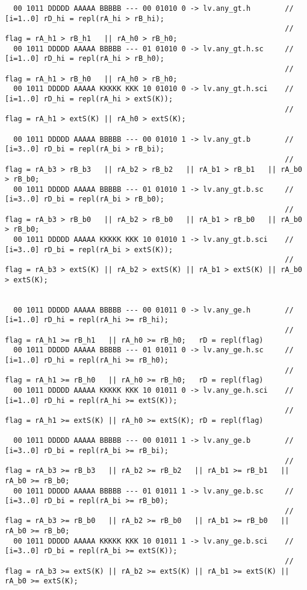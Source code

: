 \begin{landscape}
{\begin{verbatim}
  00 1011 DDDDD AAAAA BBBBB --- 00 01010 0 -> lv.any_gt.h        // [i=1..0] rD_hi = repl(rA_hi > rB_hi);    
                                                                 // flag = rA_h1 > rB_h1   || rA_h0 > rB_h0;
  00 1011 DDDDD AAAAA BBBBB --- 01 01010 0 -> lv.any_gt.h.sc     // [i=1..0] rD_hi = repl(rA_hi > rB_h0);    
                                                                 // flag = rA_h1 > rB_h0   || rA_h0 > rB_h0;
  00 1011 DDDDD AAAAA KKKKK KKK 10 01010 0 -> lv.any_gt.h.sci    // [i=1..0] rD_hi = repl(rA_hi > extS(K));  
                                                                 // flag = rA_h1 > extS(K) || rA_h0 > extS(K);

  00 1011 DDDDD AAAAA BBBBB --- 00 01010 1 -> lv.any_gt.b        // [i=3..0] rD_bi = repl(rA_bi > rB_bi);    
                                                                 // flag = rA_b3 > rB_b3   || rA_b2 > rB_b2   || rA_b1 > rB_b1   || rA_b0 > rB_b0;
  00 1011 DDDDD AAAAA BBBBB --- 01 01010 1 -> lv.any_gt.b.sc     // [i=3..0] rD_bi = repl(rA_bi > rB_b0);    
                                                                 // flag = rA_b3 > rB_b0   || rA_b2 > rB_b0   || rA_b1 > rB_b0   || rA_b0 > rB_b0;
  00 1011 DDDDD AAAAA KKKKK KKK 10 01010 1 -> lv.any_gt.b.sci    // [i=3..0] rD_bi = repl(rA_bi > extS(K));  
                                                                 // flag = rA_b3 > extS(K) || rA_b2 > extS(K) || rA_b1 > extS(K) || rA_b0 > extS(K);


  00 1011 DDDDD AAAAA BBBBB --- 00 01011 0 -> lv.any_ge.h        // [i=1..0] rD_hi = repl(rA_hi >= rB_hi);   
                                                                 // flag = rA_h1 >= rB_h1   || rA_h0 >= rB_h0;   rD = repl(flag)
  00 1011 DDDDD AAAAA BBBBB --- 01 01011 0 -> lv.any_ge.h.sc     // [i=1..0] rD_hi = repl(rA_hi >= rB_h0);   
                                                                 // flag = rA_h1 >= rB_h0   || rA_h0 >= rB_h0;   rD = repl(flag)
  00 1011 DDDDD AAAAA KKKKK KKK 10 01011 0 -> lv.any_ge.h.sci    // [i=1..0] rD_hi = repl(rA_hi >= extS(K)); 
                                                                 // flag = rA_h1 >= extS(K) || rA_h0 >= extS(K); rD = repl(flag)

  00 1011 DDDDD AAAAA BBBBB --- 00 01011 1 -> lv.any_ge.b        // [i=3..0] rD_bi = repl(rA_bi >= rB_bi);   
                                                                 // flag = rA_b3 >= rB_b3   || rA_b2 >= rB_b2   || rA_b1 >= rB_b1   || rA_b0 >= rB_b0;
  00 1011 DDDDD AAAAA BBBBB --- 01 01011 1 -> lv.any_ge.b.sc     // [i=3..0] rD_bi = repl(rA_bi >= rB_b0);   
                                                                 // flag = rA_b3 >= rB_b0   || rA_b2 >= rB_b0   || rA_b1 >= rB_b0   || rA_b0 >= rB_b0;
  00 1011 DDDDD AAAAA KKKKK KKK 10 01011 1 -> lv.any_ge.b.sci    // [i=3..0] rD_bi = repl(rA_bi >= extS(K)); 
                                                                 // flag = rA_b3 >= extS(K) || rA_b2 >= extS(K) || rA_b1 >= extS(K) || rA_b0 >= extS(K);



\end{verbatim}}
\end{landscape}
